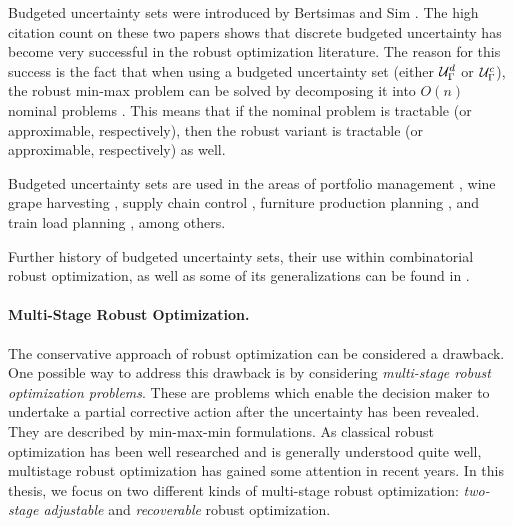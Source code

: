 Budgeted uncertainty sets were introduced by Bertsimas and Sim \cite{bertsimas2003robust,bertsimas2004price}. 
The high citation count on these two papers shows that discrete budgeted uncertainty has become very successful in the robust optimization literature. 
The reason for this success is the fact that when using a budgeted uncertainty set (either $\mathcal{U}_\Gamma^ d$ or $\mathcal{U}_\Gamma^c$), the robust min-max problem can be solved by decomposing it into $O(n)$ nominal problems \cite{bertsimas2003robust}. This means that if the nominal problem is tractable (or approximable, respectively), then the robust variant is tractable (or approximable, respectively) as well.

Budgeted uncertainty sets are used in the areas of portfolio management \cite{bertsimas2008robust}, wine grape harvesting \cite{bohle2010robust}, supply
chain control \cite{bertsimas2006robust}, furniture production planning \cite{alem2012production}, and train load planning \cite{bruns2014robust}, among others. 


Further history of budgeted uncertainty sets, their use within combinatorial robust optimization, as well as some of its generalizations can be found in \cite{poss2018robust,goerigk2023robust,goerigk2021robust}.

\paragraph*{Multi-Stage Robust Optimization.}
The conservative approach of robust optimization can be considered a drawback. One possible way to address this drawback is by considering \emph{multi-stage robust optimization problems}. 
These are problems which enable the decision maker to undertake a partial corrective action after the uncertainty has been revealed. They are described by min-max-min formulations.
As classical robust optimization has been well researched and is generally understood quite well, multistage robust optimization has gained some attention in recent years. In this thesis, we focus on two different kinds of multi-stage robust optimization:  \emph{two-stage adjustable} and \emph{recoverable} robust optimization.

